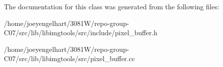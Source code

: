 The documentation for this class was generated from the following files\+:\begin{DoxyCompactItemize}
\item 
/home/joeyengelhart/3081\+W/repo-\/group-\/\+C07/src/lib/libimgtools/src/include/pixel\+\_\+buffer.\+h\item 
/home/joeyengelhart/3081\+W/repo-\/group-\/\+C07/src/lib/libimgtools/src/pixel\+\_\+buffer.\+cc\end{DoxyCompactItemize}

